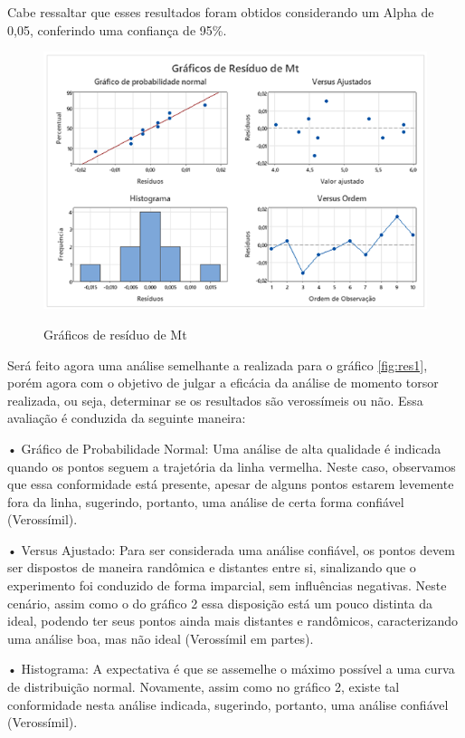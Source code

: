 \documentclass[deposito, acronym, symbols]{fei}
\begin{document}
Cabe ressaltar que esses resultados foram obtidos considerando um Alpha de 0,05, conferindo uma confiança de 95\%. 

 \begin{figure}[!htp]
    \centering
    \caption{Gráficos de resíduo de Mt}
    \includegraphics[width=0.8\linewidth]{Imagens/residuo 2.png}
    \label{fig:res2}
\end{figure}

Será feito agora uma análise semelhante a realizada para o gráfico \ref{fig:res1}, porém agora com o objetivo de julgar a eficácia da análise de momento torsor realizada, ou seja, determinar se os resultados são verossímeis ou não. Essa avaliação é conduzida da seguinte maneira:

•	Gráfico de Probabilidade Normal: Uma análise de alta qualidade é indicada quando os pontos seguem a trajetória da linha vermelha. Neste caso, observamos que essa conformidade está presente, apesar de alguns pontos estarem levemente fora da linha, sugerindo, portanto, uma análise de certa forma confiável (Verossímil).

•	Versus Ajustado: Para ser considerada uma análise confiável, os pontos devem ser dispostos de maneira randômica e distantes entre si, sinalizando que o experimento foi conduzido de forma imparcial, sem influências negativas. Neste cenário, assim como o do gráfico 2 essa disposição está um pouco distinta da ideal, podendo ter seus pontos ainda mais distantes e randômicos, caracterizando uma análise boa, mas não ideal (Verossímil em partes).

•	Histograma: A expectativa é que se assemelhe o máximo possível a uma curva de distribuição normal. Novamente, assim como no gráfico 2, existe tal conformidade nesta análise indicada, sugerindo, portanto, uma análise confiável (Verossímil).
\end{document}
